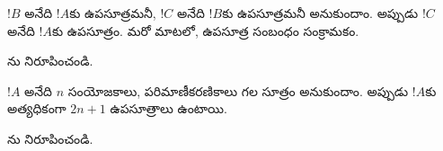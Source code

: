 \documentclass[../../../include/open-logic-section]{subfiles}
\begin{document}
\begin{prop}
$!B$ అనేది $!A$కు ఉపసూత్రమనీ, $!C$ అనేది $!B$కు ఉపసూత్రమనీ అనుకుందాం. అప్పుడు
$!C$ అనేది $!A$కు ఉపసూత్రం. మరో మాటలో, ఉపసూత్ర సంబంధం సంక్రామకం.
\end{prop}

\begin{prob}
ను నిరూపించండి.
\end{prob}

\begin{prop}
$!A$ అనేది $n$ సంయోజకాలు, పరిమాణీకరణికాలు గల సూత్రం అనుకుందాం.
అప్పుడు $!A$కు అత్యధికంగా $2n+1$ ఉపసూత్రాలు ఉంటాయి.
\end{prop}

\begin{prob}
ను నిరూపించండి.
\end{prob}
\end{document}
